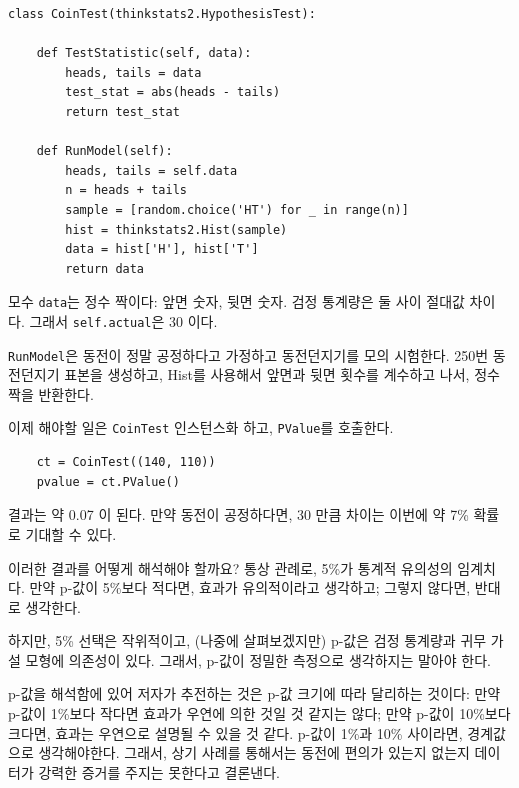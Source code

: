 
\begin{verbatim}
class CoinTest(thinkstats2.HypothesisTest):

    def TestStatistic(self, data):
        heads, tails = data
        test_stat = abs(heads - tails)
        return test_stat

    def RunModel(self):
        heads, tails = self.data
        n = heads + tails
        sample = [random.choice('HT') for _ in range(n)]
        hist = thinkstats2.Hist(sample)
        data = hist['H'], hist['T']
        return data
\end{verbatim}

모수 {\tt data}는 정수 짝이다: 앞면 숫자, 뒷면 숫자.
검정 통계량은 둘 사이 절대값 차이다. 그래서 {\tt self.actual}은 30 이다.

{\tt RunModel}은 동전이 정말 공정하다고 가정하고 동전던지기를 모의 시험한다.
250번 동전던지기 표본을 생성하고, Hist를 사용해서 앞면과 뒷면 횟수를 계수하고 나서,
정수 짝을 반환한다.

이제 해야할 일은 {\tt CoinTest} 인스턴스화 하고, {\tt PValue}를 호출한다.

\begin{verbatim}
    ct = CoinTest((140, 110))
    pvalue = ct.PValue()
\end{verbatim}

결과는 약 0.07 이 된다. 만약 동전이 공정하다면, 30 만큼 차이는 이번에 약 7\% 확률로 기대할 수 있다.

이러한 결과를 어떻게 해석해야 할까요? 통상 관례로, 5\%가 통계적 유의성의 임계치다.
만약 p-값이 5\%보다 적다면, 효과가 유의적이라고 생각하고; 그렇지 않다면, 반대로 생각한다.


하지만, 5\% 선택은 작위적이고, (나중에 살펴보겠지만) p-값은 검정 통계량과 귀무 가설 모형에 의존성이 있다.
그래서, p-값이 정밀한 측정으로 생각하지는 말아야 한다.

p-값을 해석함에 있어 저자가 추전하는 것은 p-값 크기에 따라 달리하는 것이다:
만약 p-값이 1\%보다 작다면 효과가 우연에 의한 것일 것 같지는 않다;
만약 p-값이 10\%보다 크다면, 효과는 우연으로 설명될 수 있을 것 같다.
p-값이 1\%과 10\% 사이라면, 경계값으로 생각해야한다. 그래서, 상기 사례를 통해서는 
동전에 편의가 있는지 없는지 데이터가 강력한 증거를 주지는 못한다고 결론낸다. 

